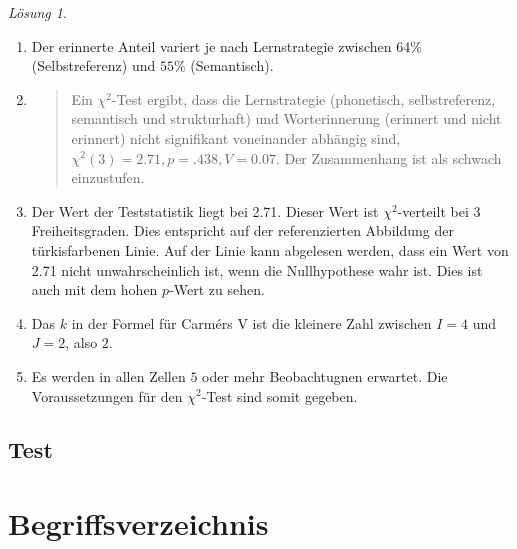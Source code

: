 \documentclass[
]{book}
\theoremstyle{definition}
\theoremstyle{definition}
\theoremstyle{definition}
\theoremstyle{definition}
\theoremstyle{remark}
\newtheorem*{solution}{Lösung}
\begin{document}
\begin{solution}
\begin{enumerate}
\def\labelenumi{\alph{enumi})}
\item
  Der erinnerte Anteil variert je nach Lernstrategie zwischen \(64\%\) (Selbstreferenz) und \(55\%\) (Semantisch).
\item
  \begin{quote}
  Ein \(\chi^2\)-Test ergibt, dass die Lernstrategie (phonetisch, selbstreferenz, semantisch und strukturhaft) und Worterinnerung (erinnert und nicht erinnert) nicht signifikant voneinander abhängig sind,
  \(\chi^2 (3) = 2.71, p = .438, V = 0.07\). Der Zusammenhang ist als schwach einzustufen.
  \end{quote}
\item
  Der Wert der Teststatistik liegt bei 2.71. Dieser Wert ist \(\chi^2\)-verteilt bei \(3\) Freiheitsgraden. Dies entspricht auf der referenzierten Abbildung der türkisfarbenen Linie. Auf der Linie kann abgelesen werden, dass ein Wert von 2.71 nicht unwahrscheinlich ist, wenn die Nullhypothese wahr ist. Dies ist auch mit dem hohen \(p\)-Wert zu sehen.
\item
  Das \(k\) in der Formel für Carmérs V ist die kleinere Zahl zwischen \(I = 4\) und \(J = 2\), also \(2\).
\item
  Es werden in allen Zellen \(5\) oder mehr Beobachtugnen erwartet. Die Voraussetzungen für den \(\chi^2\)-Test sind somit gegeben.
\end{enumerate}

\end{solution}

\section{Test}\label{test-6}

\chapter*{Begriffsverzeichnis}\label{begriffsverzeichnis}
\end{document}

